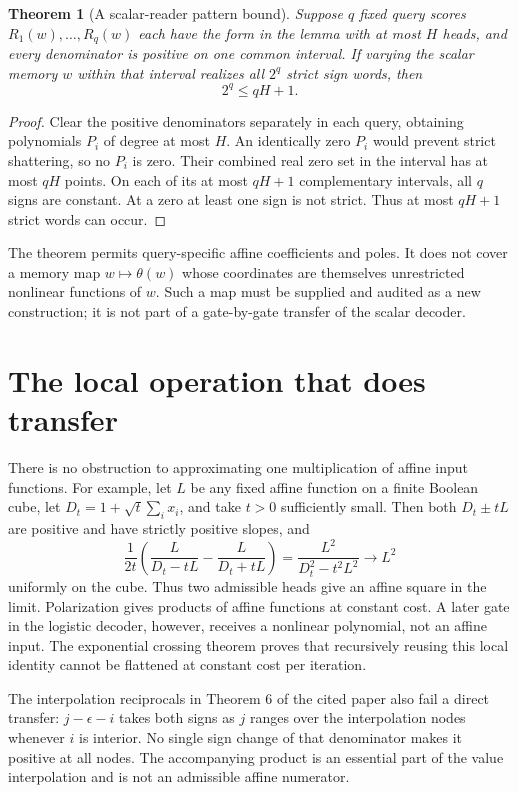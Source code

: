\documentclass[11pt]{article}
\newtheorem{theorem}{Theorem}
\begin{document}
\begin{theorem}[A scalar-reader pattern bound]
Suppose $q$ fixed query scores $R_1(w),\ldots,R_q(w)$ each have
the form in the lemma with at most $H$ heads, and every denominator
is positive on one common interval. If varying the scalar memory
$w$ within that interval realizes all $2^q$ strict sign words, then
\[
                         2^q\le qH+1.
\]
\end{theorem}
\begin{proof}
Clear the positive denominators separately in each query, obtaining
polynomials $P_i$ of degree at most $H$. An identically zero $P_i$
would prevent strict shattering, so no $P_i$ is zero. Their combined
real zero set in the interval has at most $qH$ points. On each of
its at most $qH+1$ complementary intervals, all $q$ signs are
constant. At a zero at least one sign is not strict. Thus at most
$qH+1$ strict words can occur.
\end{proof}

The theorem permits query-specific affine coefficients and poles.
It does not cover a memory map $w\mapsto\theta(w)$ whose coordinates
are themselves unrestricted nonlinear functions of $w$. Such a
map must be supplied and audited as a new construction; it is not
part of a gate-by-gate transfer of the scalar decoder.

\section{The local operation that does transfer}

There is no obstruction to approximating one multiplication of
affine input functions. For example, let $L$ be any fixed affine
function on a finite Boolean cube, let
$D_t=1+\sqrt t\sum_i x_i$, and take $t>0$ sufficiently small.
Then both $D_t\pm tL$ are positive and have strictly positive
slopes, and
\[
 \frac1{2t}\left(\frac{L}{D_t-tL}-\frac{L}{D_t+tL}\right)
       =\frac{L^2}{D_t^2-t^2L^2}\longrightarrow L^2
\]
uniformly on the cube. Thus two admissible heads give an affine
square in the limit. Polarization gives products of affine
functions at constant cost. A later gate in the logistic decoder,
however, receives a nonlinear polynomial, not an affine input.
The exponential crossing theorem proves that recursively reusing
this local identity cannot be flattened at constant cost per
iteration.

The interpolation reciprocals in Theorem 6 of the cited paper
also fail a direct transfer: $j-\epsilon-i$ takes both signs as
$j$ ranges over the interpolation nodes whenever $i$ is interior.
No single sign change of that denominator makes it positive at
all nodes. The accompanying product is an essential part of the
value interpolation and is not an admissible affine numerator.
\end{document}
